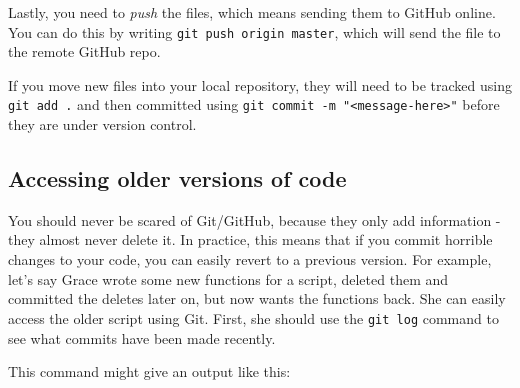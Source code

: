 \documentclass[]{book}
\newenvironment{Shaded}{\begin{snugshade}}{\end{snugshade}}
\newcommand{\StringTok}[1]{\textcolor[rgb]{0.31,0.60,0.02}{#1}}
\newcommand{\OperatorTok}[1]{\textcolor[rgb]{0.81,0.36,0.00}{\textbf{#1}}}
\newcommand{\ErrorTok}[1]{\textcolor[rgb]{0.64,0.00,0.00}{\textbf{#1}}}
\newcommand{\NormalTok}[1]{#1}
\begin{document}
\begin{Shaded}
\end{Shaded}

Lastly, you need to \emph{push} the files, which means sending them to
GitHub online. You can do this by writing
\texttt{git\ push\ origin\ master}, which will send the file to the
remote GitHub repo.

\begin{Shaded}
\end{Shaded}

If you move new files into your local repository, they will need to be
tracked using \texttt{git\ add\ .} and then committed using
\texttt{git\ commit\ -m\ "\textless{}message-here\textgreater{}"} before
they are under version control.

\subsection{Accessing older versions of
code}\label{accessing-older-versions-of-code}

You should never be scared of Git/GitHub, because they only add
information - they almost never delete it. In practice, this means that
if you commit horrible changes to your code, you can easily revert to a
previous version. For example, let's say Grace wrote some new functions
for a script, deleted them and committed the deletes later on, but now
wants the functions back. She can easily access the older script using
Git. First, she should use the \texttt{git\ log} command to see what
commits have been made recently.

\begin{Shaded}
\end{Shaded}

This command might give an output like this:
\end{document}
